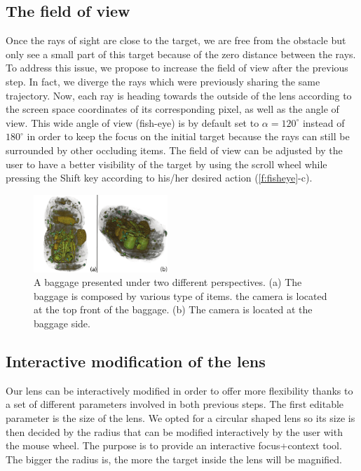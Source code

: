 \subsection{The field of view}
Once the rays of sight are close to the target, we are free from the obstacle but only see a small part of this target because of the zero distance between the rays. To address this issue, we propose to increase the field of view after the previous step. In fact, we diverge the rays which were previously sharing the same trajectory. Now, each ray is heading towards the outside of the lens according to the screen space coordinates of its corresponding pixel, as well as the angle of view. This wide angle of view (fish-eye) is by default set to $\alpha = 120^{\circ}$ instead of $180^{\circ}$ in order to keep the focus on the initial target because the rays can still be surrounded by other occluding items. The field of view can be adjusted by the user to have a better visibility of the target by using the scroll wheel while pressing the Shift key according to his/her desired action (\autoref{f:fisheye}-c).
\begin{figure} 
\includegraphics [width=0.45\textwidth]{images/bagage_orientation_bis.pdf} 
\caption{ A baggage presented under two different perspectives. (a) The baggage is composed by various type of items. the camera is located at the top front of the baggage. (b) The camera is located at the baggage side.  }
\label{f:baggage_orientation}
\end{figure}

\subsection{Interactive modification of the lens}
Our lens can be interactively modified in order to offer more flexibility thanks to a set of different parameters involved in both previous steps. The first editable parameter is the size of the lens. We opted for a circular shaped lens so its size is then decided by the radius that can be modified interactively by the user with the mouse wheel. The purpose is to provide an interactive focus+context tool. The bigger the radius is, the more the target inside the lens will be magnified. 

